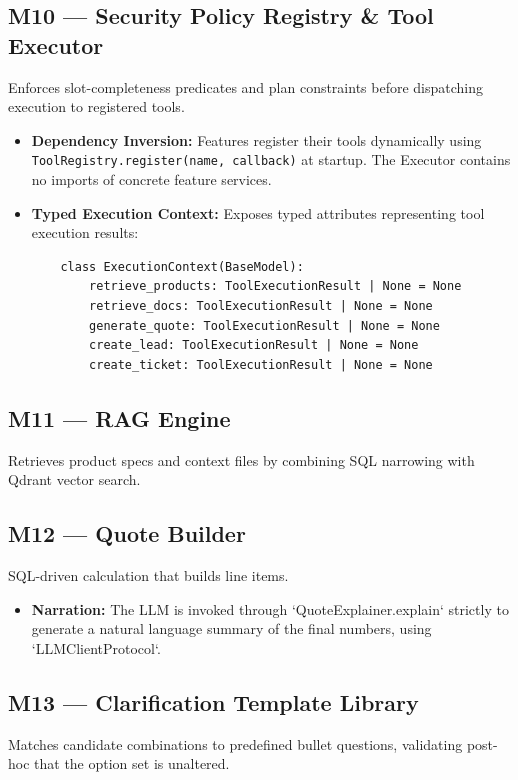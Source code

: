 \documentclass[11pt,a4paper]{article}
\begin{document}
\subsection{M10 — Security Policy Registry \& Tool Executor}
Enforces slot-completeness predicates and plan constraints before dispatching execution to registered tools.
\begin{itemize}
    \item \textbf{Dependency Inversion:} Features register their tools dynamically using \texttt{ToolRegistry.register(name, callback)} at startup. The Executor contains no imports of concrete feature services.
    \item \textbf{Typed Execution Context:} Exposes typed attributes representing tool execution results:
    \begin{lstlisting}
    class ExecutionContext(BaseModel):
        retrieve_products: ToolExecutionResult | None = None
        retrieve_docs: ToolExecutionResult | None = None
        generate_quote: ToolExecutionResult | None = None
        create_lead: ToolExecutionResult | None = None
        create_ticket: ToolExecutionResult | None = None
    \end{lstlisting}
\end{itemize}

\subsection{M11 — RAG Engine}
Retrieves product specs and context files by combining SQL narrowing with Qdrant vector search.

\subsection{M12 — Quote Builder}
SQL-driven calculation that builds line items.
\begin{itemize}
    \item \textbf{Narration:} The LLM is invoked through `QuoteExplainer.explain` strictly to generate a natural language summary of the final numbers, using `LLMClientProtocol`.
\end{itemize}

\subsection{M13 — Clarification Template Library}
Matches candidate combinations to predefined bullet questions, validating post-hoc that the option set is unaltered.
\end{document}
